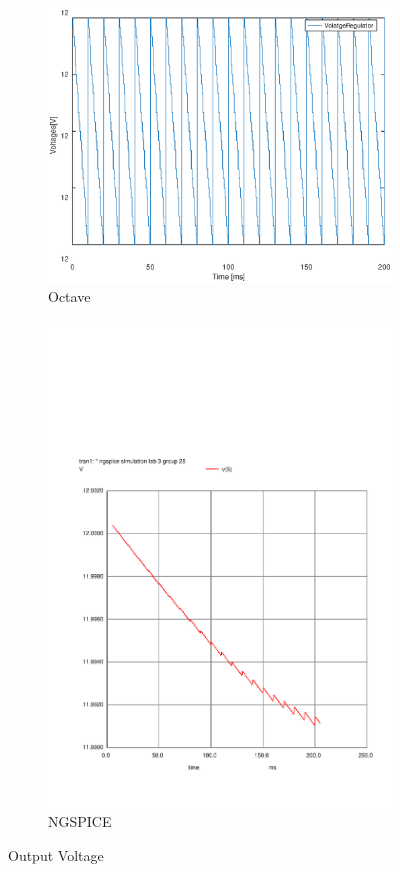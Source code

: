 \begin{figure}[H] 
\centering
\begin{subfigure}{0.4\textwidth}
\includegraphics[width=\textwidth]{VoltageRegulator.eps}
\caption{Octave}
\label{fig:first}
\end{subfigure}
\begin{subfigure}{0.3\textwidth}
\includegraphics[width=\textwidth]{sim33.pdf}
\caption{NGSPICE}
\label{fig:second}
\end{subfigure}
\caption{Output Voltage}
\end{figure}

